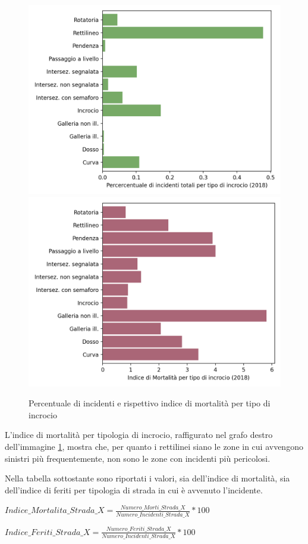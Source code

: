 \documentclass[a4paper]{report}
\begin{document}
\begin{figure}
    \includegraphics[width=0.5\linewidth]{../src/incidenti/incidenti_senza_coords/localizzazione_incidente/intersezioni.png}
    \includegraphics[width=0.5\linewidth]{../src/incidenti/incidenti_senza_coords/localizzazione_incidente/indice_mortalita.png}
    \caption{Percentuale di incidenti e rispettivo indice di mortalità per tipo di incrocio}
    \label{fig:tipo-intersezioni}
\end{figure}

L'indice di mortalità per tipologia di incrocio, raffigurato nel grafo destro 
dell'immagine \ref{fig:tipo-intersezioni}, mostra che, per quanto i rettilinei 
siano le zone in cui avvengono sinistri più frequentemente, non sono le zone 
con incidenti più pericolosi. 

Nella tabella sottostante sono riportati i valori, sia dell'indice di mortalità, 
sia dell'indice di feriti per tipologia di strada in cui è avvenuto l'incidente.

\begin{center}
    $Indice\_Mortalita\_Strada\_X = \displaystyle \frac{Numero\_Morti\_Strada\_X}{Numero\_Incidenti\_Strada\_X} * 100$ 
\end{center}

\begin{center}
    $Indice\_Feriti\_Strada\_X = \displaystyle \frac{Numero\_Feriti\_Strada\_X}{Numero\_Incidenti\_Strada\_X} * 100$ 
\end{center}
\end{document}
